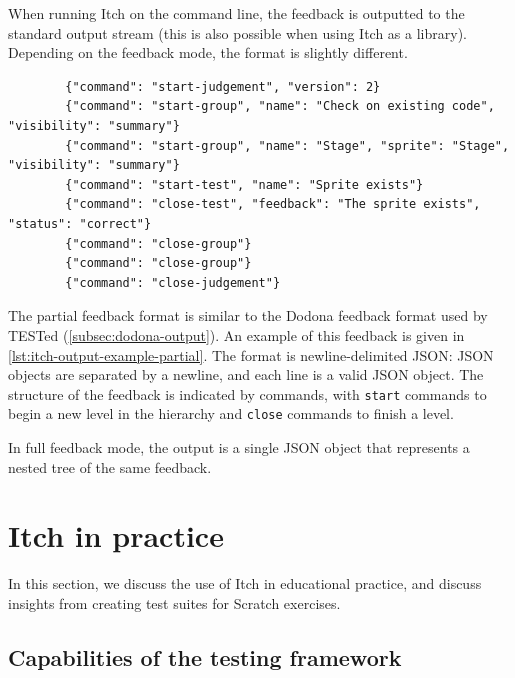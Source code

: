 \documentclass[../main]{subfiles}
\begin{document}
When running Itch on the command line, the feedback is outputted to the standard output stream (this is also possible when using Itch as a library).
Depending on the feedback mode, the format is slightly different.

\begin{listing}
    \begin{verbatim}
        {"command": "start-judgement", "version": 2}
        {"command": "start-group", "name": "Check on existing code", "visibility": "summary"}
        {"command": "start-group", "name": "Stage", "sprite": "Stage", "visibility": "summary"}
        {"command": "start-test", "name": "Sprite exists"}
        {"command": "close-test", "feedback": "The sprite exists", "status": "correct"}
        {"command": "close-group"}
        {"command": "close-group"}
        {"command": "close-judgement"}
    \end{verbatim}
    \caption{Example of the output generated by Itch for a test suite with two nested groups, with one test. Note the similarity to \cref{lst:tested-output-example}.}\label{lst:itch-output-example-partial}
\end{listing}

The partial feedback format is similar to the Dodona feedback format used by TESTed (\cref{subsec:dodona-output}).
An example of this feedback is given in \cref{lst:itch-output-example-partial}.
The format is newline-delimited JSON: JSON objects are separated by a newline, and each line is a valid JSON object.
The structure of the feedback is indicated by commands, with \texttt{start} commands to begin a new level in the hierarchy and \texttt{close} commands to finish a level.

In full feedback mode, the output is a single JSON object that represents a nested tree of the same feedback.

\section{Itch in practice}\label{sec:itch-evaluation}

In this section, we discuss the use of Itch in educational practice, and discuss insights from creating test suites for Scratch exercises.

\subsection{Capabilities of the testing framework}\label{subsec:capabilities-of-the-testing-framework}
\end{document}
